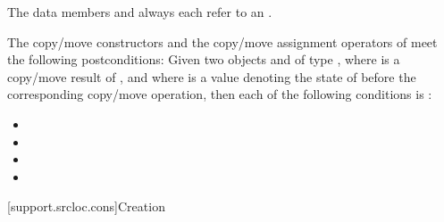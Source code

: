 \pnum
The data members  and 
always each refer to an \ntbs{}.

\pnum
The copy/move constructors and the copy/move assignment operators of
 meet the following postconditions:
Given two objects   and  of type ,
where  is a copy/move result of , and
where  is a value denoting the state of 
before the corresponding copy/move operation,
then each of the following conditions is :
\begin{itemize}
\item {}
\item {}
\item {}
\item {}
\end{itemize}

[support.srcloc.cons]{Creation}

